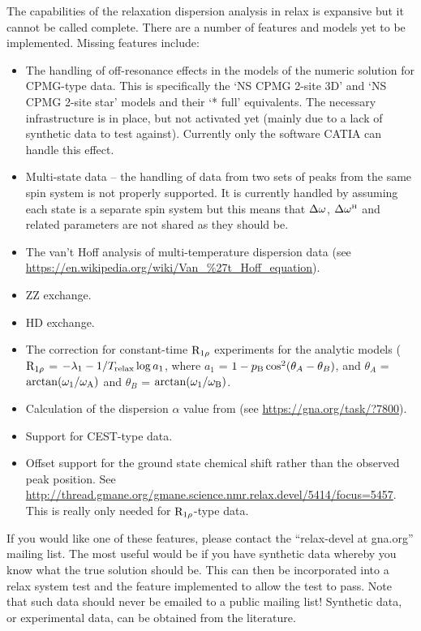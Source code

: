 The capabilities of the relaxation dispersion analysis in relax is expansive but it cannot be called complete.
There are a number of features and models yet to be implemented.
Missing features include:
\begin{itemize}
  \item The handling of off-resonance effects in the models of the numeric solution for CPMG-type data.
    This is specifically the `NS CPMG 2-site 3D' and `NS CPMG 2-site star' models and their `* full' equivalents.
    The necessary infrastructure is in place, but not activated yet (mainly due to a lack of synthetic data to test against).
    Currently only the software CATIA can handle this effect.
  \item Multi-state data -- the handling of data from two sets of peaks from the same spin system is not properly supported.
    It is currently handled by assuming each state is a separate spin system but this means that $\Delta\omega$, $\Delta\omega^{\scriptscriptstyle\mathrm{H}}$ and related parameters are not shared as they should be.
  \item The van't Hoff analysis of multi-temperature dispersion data (see \url{https://en.wikipedia.org/wiki/Van\_\%27t\_Hoff\_equation}).
  \item ZZ exchange.
  \item HD exchange.
  \item The \citet{Korzhnev05a} correction for constant-time $\mathrm{R}_{1\rho}$ experiments for the analytic models ($\mathrm{R}_{1\rho}$ = $-\lambda_1 -1/T_{\textrm{relax}}\log{a_1}$, where $a_1$ = $1 - p_{\textrm{B}}\cos^2(\theta_A - \theta_B)$, and $\theta_A$ = $\arctan(\omega_1/\omega_{\textrm{A}})$ and $\theta_B$ = $\arctan(\omega_1/\omega_{\textrm{B}})$.
  \item Calculation of the dispersion $\alpha$ value from \cite{Millet00} (see \url{https://gna.org/task/?7800}).
  \item Support for CEST-type data.
  \item Offset support for the ground state chemical shift rather than the observed peak position.
    See \url{http://thread.gmane.org/gmane.science.nmr.relax.devel/5414/focus=5457}.
    This is really only needed for $\mathrm{R}_{1\rho}$-type data.
\end{itemize}

If you would like one of these features, please contact the ``relax-devel at gna.org'' mailing list.
The most useful would be if you have synthetic data whereby you know what the true solution should be.
This can then be incorporated into a relax system test and the feature implemented to allow the test to pass.
Note that such data should never be emailed to a public mailing list!
Synthetic data, or experimental data, can be obtained from the literature.


